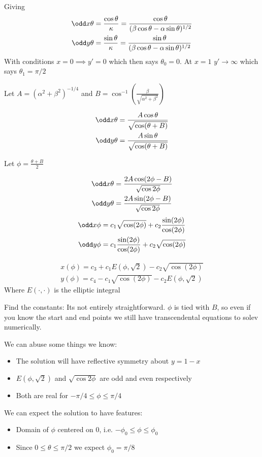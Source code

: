 \documentclass{E:/Documents/Latex/myassignment}
\begin{document}
Giving
\begin{align*}
	\odd x\theta &= \frac{\cos\theta }{\kappa} = \frac{\cos\theta}{(\beta \cos\theta - \alpha \sin \theta)^{1/2}}\\
	\odd y\theta &= \frac{\sin\theta}{\kappa} = \frac{\sin\theta}{(\beta \cos\theta - \alpha \sin \theta)^{1/2}}
\end{align*}
With conditions $x=0 \implies y' = 0$ which then says $\theta_0 = 0$. At $x=1$ $y'\to\infty$ which says $\theta_1 = \pi/2$

Let $A = (\alpha^2 + \beta^2)^{-1/4}$ and $B = \cos^{-1} \left(\frac{\beta}{\sqrt{\alpha^2 + \beta^2}}\right)$

\begin{align*}
	\odd x\theta &= \frac{A\cos\theta}{\sqrt{\cos(\theta+B)}}\\
	\odd y\theta &= \frac{A\sin\theta}{\sqrt{\cos(\theta+B)}}
\end{align*}

Let $\phi = \frac{\theta+B}{2}$

\begin{align*}
	\odd x\theta &= \frac{2A\cos(2\phi -B)}{\sqrt{\cos 2\phi}}\\
	\odd y\theta &= \frac{2A\sin(2\phi -B)}{\sqrt{\cos 2\phi}}\\
\end{align*}
\begin{align*}
	\odd x\phi &= c_1 \sqrt{\cos(2\phi)} + c_2 \frac{\sin(2\phi)}{\cos(2\phi)}\\
	\odd y\phi &= c_1 \frac{\sin(2\phi)}{\cos(2\phi)} + c_2 \sqrt{\cos(2\phi)} \\
\end{align*}

\begin{align*}
	x(\phi) = c_3 + c_1 E(\phi,\sqrt{2}) - c_2\sqrt{\cos(2\phi)}\\
	y(\phi) = c_4 - c_1 \sqrt{\cos(2\phi)} - c_2 E(\phi,\sqrt{2})
\end{align*}
Where $E(\cdot,\cdot)$ is the elliptic integral

Find the constants:
Its not entirely straightforward. $\phi$ is tied with $B$, so even if you know the start and end points we still have transcendental equations to solev numerically. 

We can abuse some things we know:
\begin{itemize}
	\item The solution will have reflective symmetry about $y = 1-x$
	\item $E(\phi,\sqrt{2})$ and $\sqrt{\cos 2\phi}$ are odd and even respectively
	\item Both are real for $-\pi/4 \leq \phi \leq \pi/4$
\end{itemize}
We can expect the solution to have features:
\begin{itemize}
	\item Domain of $\phi$ centered on $0$, i.e. $-\phi_0 \leq \phi \leq \phi_0$
	\item Since $0 \leq \theta \leq \pi/2$ we expect $\phi_0 = \pi/8$
\end{itemize}
\end{document}
